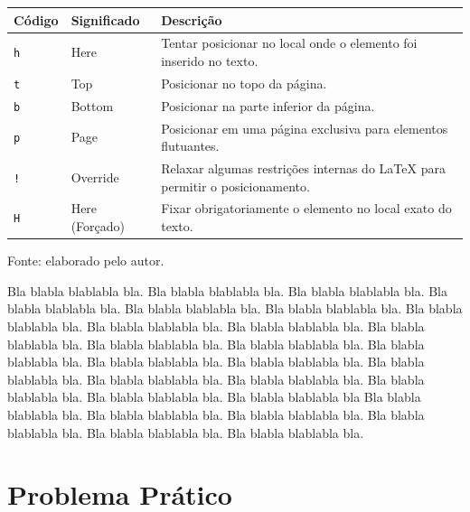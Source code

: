 \documentclass[diss,capa,times,english]{ppgci}
\begin{document}
\begin{quadro}[!htbp]
    \centering
    \caption{Opções de posicionamento de elementos flutuantes no \LaTeX.}
    \label{qua_posicionamento}
    \begin{tabular}{|p{3cm}|p{3cm}|p{8cm}|}
        \hline
        \small \textbf{Código} & \small \textbf{Significado} & \small \textbf{Descrição}\\
        \hline
        {\small \texttt{h}} & {\small Here} & {\small Tentar posicionar no local onde o elemento foi inserido no texto.}\\
        \hline
        {\small \texttt{t}} & {\small Top} & {\small Posicionar no topo da página.}\\
        \hline
        {\small \texttt{b}} & {\small Bottom} & {\small Posicionar na parte inferior da página.}\\
        \hline
        {\small \texttt{p}} & {\small Page} & {\small Posicionar em uma página exclusiva para elementos flutuantes.}\\
        \hline
        {\small \texttt{!}} & {\small Override} & {\small Relaxar algumas restrições internas do \LaTeX{} para permitir o posicionamento.}\\
        \hline
        {\small \texttt{H}} & {\small Here (Forçado)} & {\small Fixar obrigatoriamente o elemento no local exato do texto.}\\
        \hline
    \end{tabular}
    \vspace{2pt}
    {\small Fonte: elaborado pelo autor.}
\end{quadro}

Bla blabla blablabla bla.  Bla blabla blablabla bla.  Bla blabla
blablabla bla.  Bla blabla blablabla bla.  Bla blabla blablabla bla.
Bla blabla blablabla bla. 
Bla blabla blablabla bla.  Bla blabla blablabla bla.  Bla blabla
blablabla bla.  Bla blabla blablabla bla.  Bla blabla blablabla bla.
Bla blabla blablabla bla.  Bla blabla blablabla bla.  Bla blabla
blablabla bla.  Bla blabla blablabla bla.  Bla blabla blablabla bla.
Bla blabla blablabla bla.  Bla blabla blablabla bla.  Bla blabla
blablabla bla.  Bla blabla blablabla bla.  Bla blabla blablabla bla
Bla blabla blablabla bla.  Bla blabla blablabla bla.  Bla blabla
blablabla bla.  Bla blabla blablabla bla.  Bla blabla blablabla bla.
Bla blabla blablabla bla. 

\section{Problema Prático} %
\end{document}
